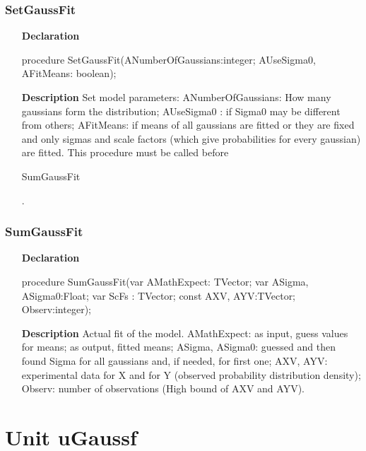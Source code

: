 \documentclass[12pt,a4paper,oneside]{report}
\newcommand{\lmath}[1]{   %
	\marginpar{\vspace{#1} 
		\begin{flushright}
			LMath
	\end{flushright} }
}
\newcommand{\declarationitem}[1]{\textbf{#1}}
\newcommand{\descriptiontitle}[1]{\textbf{#1}}
\begin{document}
\subsubsection{SetGaussFit}
\label{ugauss-SetGaussFit}
\begin{itemize}\item[\declarationitem{Declaration}\hfill]
	\begin{flushleft}
		\begin{ttfamily}
			procedure SetGaussFit(ANumberOfGaussians:integer; AUseSigma0, AFitMeans: boolean);\end{ttfamily}
		
	\end{flushleft}
	\item[\descriptiontitle{Description}]
	Set model parameters: ANumberOfGaussians: How many gaussians form the distribution; AUseSigma0 : if Sigma0 may be different from others; AFitMeans: if means of all gaussians are fitted or they are fixed and only sigmas and scale factors (which give probabilities for every gaussian) are fitted. This procedure must be called before \begin{ttfamily} SumGaussFit \end{ttfamily}.
\end{itemize}
\subsubsection{SumGaussFit}
\label{ugauss-SumGaussFit}
\begin{itemize}\item[\declarationitem{Declaration}\hfill]
	\begin{flushleft}
		\begin{ttfamily}
			procedure SumGaussFit(var AMathExpect: TVector; var ASigma, ASigma0:Float; var ScFs : TVector; const AXV, AYV:TVector; Observ:integer);\end{ttfamily}
	\end{flushleft}
	\item[\descriptiontitle{Description}]
	Actual fit of the model. AMathExpect: as input, guess values for means; as output, fitted means; ASigma, ASigma0: guessed and then found Sigma for all gaussians and, if needed, for first one; AXV, AYV: experimental data for X and for Y (observed probability distribution density); Observ: number of observations (High bound of AXV and AYV).
\end{itemize}
\section{Unit uGaussf}\lmath{-24pt}
\label{ugaussf}
\end{document}
